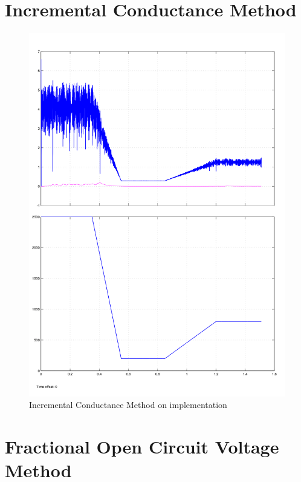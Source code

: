  \section{Incremental Conductance Method }
 
  \begin{figure}[H]
	   \begin{center}
		   \includegraphics[width=\textwidth]{images/inC_stateflow_changing_lux-1}
		   \caption{Incremental Conductance Method on implementation  }
		   \label{fig:Inc_result}
	   \end{center}
  \end{figure}
 \section{Fractional Open Circuit Voltage Method }
 
